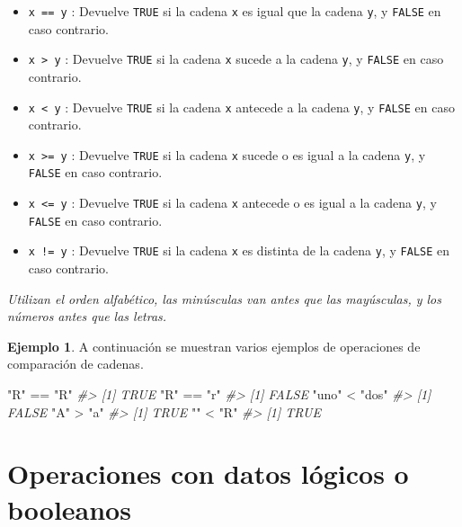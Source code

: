 \documentclass[
]{book}
\newenvironment{Shaded}{\begin{snugshade}}{\end{snugshade}}
\newcommand{\CommentTok}[1]{\textcolor[rgb]{0.56,0.35,0.01}{\textit{#1}}}
\newcommand{\SpecialCharTok}[1]{\textcolor[rgb]{0.00,0.00,0.00}{#1}}
\newcommand{\StringTok}[1]{\textcolor[rgb]{0.31,0.60,0.02}{#1}}
\providecommand{\tightlist}{%
  \setlength{\itemsep}{0pt}\setlength{\parskip}{0pt}}
\theoremstyle{definition}
\theoremstyle{definition}
\newtheorem{example}{Ejemplo}[chapter]
\theoremstyle{definition}
\theoremstyle{definition}
\theoremstyle{remark}
\begin{document}
\begin{itemize}
\tightlist
\item
  \texttt{x\ ==\ y} : Devuelve \texttt{TRUE} si la cadena \texttt{x} es igual que la cadena \texttt{y}, y \texttt{FALSE} en caso contrario.
\item
  \texttt{x\ \textgreater{}\ y} : Devuelve \texttt{TRUE} si la cadena \texttt{x} sucede a la cadena \texttt{y}, y \texttt{FALSE} en caso contrario.
\item
  \texttt{x\ \textless{}\ y} : Devuelve \texttt{TRUE} si la cadena \texttt{x} antecede a la cadena \texttt{y}, y \texttt{FALSE} en caso contrario.
\item
  \texttt{x\ \textgreater{}=\ y} : Devuelve \texttt{TRUE} si la cadena \texttt{x} sucede o es igual a la cadena \texttt{y}, y \texttt{FALSE} en caso contrario.
\item
  \texttt{x\ \textless{}=\ y} : Devuelve \texttt{TRUE} si la cadena \texttt{x} antecede o es igual a la cadena \texttt{y}, y \texttt{FALSE} en caso contrario.
\item
  \texttt{x\ !=\ y} : Devuelve \texttt{TRUE} si la cadena \texttt{x} es distinta de la cadena \texttt{y}, y \texttt{FALSE} en caso contrario.
\end{itemize}

\emph{Utilizan el orden alfabético, las minúsculas van antes que las mayúsculas, y los números antes que las letras.}

\begin{example}

A continuación se muestran varios ejemplos de operaciones de comparación de cadenas.

\begin{Shaded}
\begin{Highlighting}[]
\StringTok{"R"} \SpecialCharTok{==} \StringTok{"R"}
\CommentTok{\#\textgreater{} [1] TRUE}
\StringTok{"R"} \SpecialCharTok{==} \StringTok{"r"}
\CommentTok{\#\textgreater{} [1] FALSE}
\StringTok{"uno"} \SpecialCharTok{\textless{}} \StringTok{"dos"}
\CommentTok{\#\textgreater{} [1] FALSE}
\StringTok{"A"} \SpecialCharTok{\textgreater{}} \StringTok{"a"}
\CommentTok{\#\textgreater{} [1] TRUE}
\StringTok{""} \SpecialCharTok{\textless{}} \StringTok{"R"}
\CommentTok{\#\textgreater{} [1] TRUE}
\end{Highlighting}
\end{Shaded}

\end{example}

\hypertarget{operaciones-con-datos-luxf3gicos-o-booleanos}{%
\section{Operaciones con datos lógicos o booleanos}\label{operaciones-con-datos-luxf3gicos-o-booleanos}}
\end{document}
